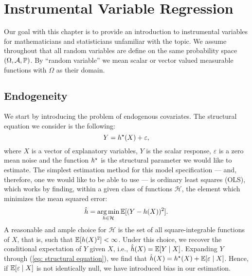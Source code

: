 \chapter{Instrumental Variable Regression}

Our goal with this chapter is to provide an introduction to instrumental variables for mathematicians and statisticians unfamiliar with the topic.
We assume throughout that all random variables are define on the same probability space $ ( \Omega, \mathcal{A}, \mathbb{P} ) $.
By ``random variable'' we mean scalar or vector valued measurable functions with $ \Omega $ as their domain.

\section{Endogeneity}

We start by introducing the problem of endogenous covariates.
The structural equation we consider is the following:
\begin{equation}
    \label{eq: structural equation}
    Y = h^{ \star } ( X ) + \varepsilon
,\end{equation}
where $ X $ is a vector of explanatory variables, $ Y $ is the scalar response, $ \varepsilon $ is a zero mean noise and the function $ h^{ \star } $ is the structural parameter we would like to estimate.
The simplest estimation method for this model specification --- and, therefore, one we would like to be able to use --- is ordinary least squares (OLS), which works by finding, within a given class of functions $ \mathcal{H} $, the element which minimizes the mean squared error:
\begin{equation}
    \label{eq: ols estimate}
    \hat{ h } = \operatorname*{arg\,min}_{ h \in \mathcal{H} } \mathbb{E} [ 
        ( Y - h ( X ) )^2
    ]
.\end{equation}
A reasonable and ample choice for $ \mathcal{H} $ is the set of all square-integrable functions of $ X $, that is, such that $ \mathbb{E} [ h ( X )^2 ] < \infty $.
Under this choice, we recover the conditional expectation of $ Y $ given $ X $, i.e., $ \hat{ h } ( X ) = \mathbb{E} [ Y \mid X ] $.
Expanding $ Y $ through (\ref{eq: structural equation}), we find that $ \hat{ h } ( X ) = h^{ \star } ( X ) + \mathbb{E} [ \varepsilon \mid X ] $.
Hence, if $ \mathbb{E} [ \varepsilon \mid X ] $ is not identically null, we have introduced bias in our estimation.


